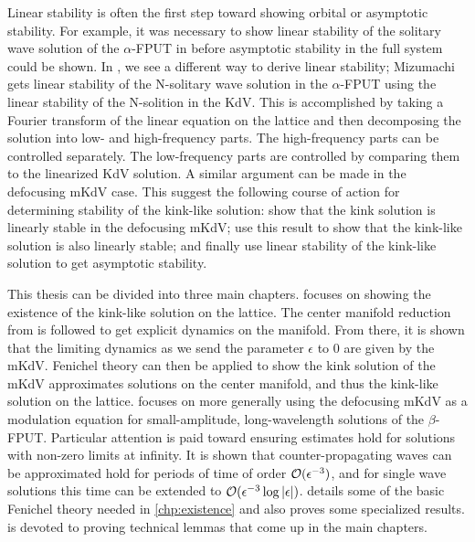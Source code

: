 Linear stability is often the first step toward showing orbital or asymptotic stability. For example, it was necessary to show linear stability of the solitary wave solution of the \(\alpha\)-FPUT in \cite{friesecke2003solitary,friesecke2004solitary} before asymptotic stability in the full system could be shown. In \cite{mizumachi2013asymptotic}, we see a different way to derive linear stability; Mizumachi gets linear stability of the N-solitary wave solution in the \(\alpha\)-FPUT using the linear stability of the N-solition in the KdV. This is accomplished by taking a Fourier transform of the linear equation on the lattice and then decomposing the solution into low- and high-frequency parts. The high-frequency parts can be controlled separately. The low-frequency parts are controlled by comparing them to the linearized KdV solution. A similar argument can be made in the defocusing mKdV case. This suggest the following course of action for determining stability of the kink-like solution: show that the kink solution is linearly stable in the defocusing mKdV; use this result to show that the kink-like solution is also linearly stable; and finally use linear stability of the kink-like solution to get asymptotic stability.

This thesis can be divided into three main chapters.  focuses on showing the existence of the kink-like solution on the lattice. The center manifold reduction from \cite{iooss2000travelling} is followed to get explicit dynamics on the manifold. From there, it is shown that the limiting dynamics as we send the parameter \(\epsilon\) to \(0\) are given by the mKdV. Fenichel theory can then be applied to show the kink solution of the mKdV approximates solutions on the center manifold, and thus the kink-like solution on the lattice.  focuses on more generally using the defocusing  mKdV as a modulation equation for small-amplitude, long-wavelength solutions of the \(\beta\)-FPUT. Particular attention is paid toward ensuring estimates hold for solutions with non-zero limits at infinity. It is shown that counter-propagating waves can be approximated hold for periods of time of order \(\mathcal{O}(\epsilon^{-3})\), and for single wave solutions this time can be extended to \(\mathcal{O}(\epsilon^{-3} \log|\epsilon|)\).  details some of the basic Fenichel theory needed in \cref{chp:existence} and also proves some specialized results.  is devoted to proving technical lemmas that come up in the main chapters.